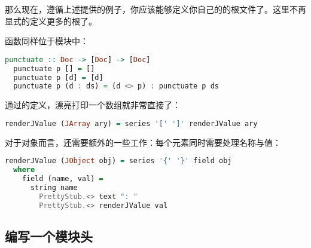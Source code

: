 \documentclass[./main.tex]{subfiles}
\begin{document}
那么现在，遵循上述提供的例子，你应该能够定义你自己的的根文件了。这里不再显式的定义更多的根了。

函数同样位于模块中：

\begin{lstlisting}[language=Haskell]
  punctuate :: Doc -> [Doc] -> [Doc]
  punctuate p [] = []
  punctuate p [d] = [d]
  punctuate p (d : ds) = (d <> p) : punctuate p ds
\end{lstlisting}

通过的定义，漂亮打印一个数组就非常直接了：

\begin{lstlisting}[language=Haskell]
  renderJValue (JArray ary) = series '[' ']' renderJValue ary
\end{lstlisting}

对于对象而言，还需要额外的一些工作：每个元素同时需要处理名称与值：

\begin{lstlisting}[language=Haskell]
  renderJValue (JObject obj) = series '{' '}' field obj
  where
    field (name, val) =
      string name
        PrettyStub.<> text ": "
        PrettyStub.<> renderJValue val
\end{lstlisting}

\subsection*{编写一个模块头}

\end{document}
